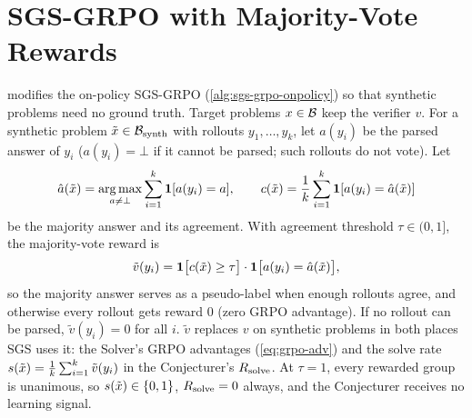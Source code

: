 \section{SGS-GRPO with Majority-Vote Rewards}
\label{app:sgs-grpo-mv}

 modifies the on-policy SGS-GRPO
(\cref{alg:sgs-grpo-onpolicy}) so that synthetic problems need no ground truth.
Target problems $x \in \mathcal{B}$ keep the verifier $v$. For a synthetic problem
$\tilde{x} \in \mathcal{B}_{\mathrm{synth}}$ with rollouts $y_1,\dots,y_k$, let $a(y_i)$ be the parsed
answer of $y_i$ ($a(y_i) = \bot$ if it cannot be parsed; such rollouts do not
vote). Let
\begin{equation}
  \hat{a}(\tilde{x}) = \operatorname*{arg\,max}_{a \neq \bot} \sum_{i=1}^{k} \mathbf{1}[a(y_i) = a],
  \qquad
  c(\tilde{x}) = \frac{1}{k} \sum_{i=1}^{k} \mathbf{1}[a(y_i) = \hat{a}(\tilde{x})]
  \label{eq:mv-mode}
\end{equation}
be the majority answer and its agreement. With agreement threshold
$\tau \in (0, 1]$, the majority-vote reward is
\begin{equation}
  \tilde{v}(y_i) = \mathbf{1}\big[c(\tilde{x}) \geq \tau\big] \cdot \mathbf{1}\big[a(y_i) = \hat{a}(\tilde{x})\big],
  \label{eq:mv-reward}
\end{equation}
so the majority answer serves as a pseudo-label when enough rollouts agree,
and otherwise every rollout gets reward $0$ (zero GRPO advantage). If no
rollout can be parsed, $\tilde{v}(y_i) = 0$ for all $i$.
$\tilde{v}$ replaces $v$ on synthetic problems in both places SGS uses it:
the Solver's GRPO advantages (\cref{eq:grpo-adv}) and the solve rate
$s(\tilde{x}) = \frac{1}{k}\sum_{i=1}^{k} \tilde{v}(y_i)$ in the Conjecturer's
$R_{\text{solve}}$. At $\tau = 1$, every rewarded group is unanimous, so
$s(\tilde{x}) \in \{0, 1\}$, $R_{\text{solve}} = 0$ always, and the Conjecturer receives no
learning signal.

